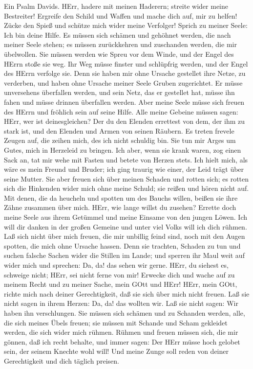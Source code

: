  Ein Psalm Davids. HErr, hadere mit meinen Haderern; streite
wider meine Bestreiter!  Ergreife den Schild und Waffen und
mache dich auf, mir zu helfen!  Zücke den Spieß und schütze
mich wider meine Verfolger! Sprich zu meiner Seele: Ich bin deine Hilfe.
 Es müssen sich schämen und gehöhnet werden, die nach meiner
Seele stehen; es müssen zurückkehren und zuschanden werden, die mir
übelwollen.  Sie müssen werden wie Spreu vor dem Winde, und
der Engel des HErrn stoße sie weg.  Ihr Weg müsse finster
und schlüpfrig werden, und der Engel des HErrn verfolge sie.
 Denn sie haben mir ohne Ursache gestellet ihre Netze, zu
verderben, und haben ohne Ursache meiner Seele Gruben zugerichtet.
 Er müsse unversehens überfallen werden, und sein Netz, das
er gestellet hat, müsse ihn fahen und müsse drinnen überfallen werden.
 Aber meine Seele müsse sich freuen des HErrn und fröhlich
sein auf seine Hilfe.  Alle meine Gebeine müssen sagen:
HErr, wer ist deinesgleichen? Der du den Elenden errettest von dem, der
ihm zu stark ist, und den Elenden und Armen von seinen Räubern.
 Es treten frevele Zeugen auf, die zeihen mich, des ich
nicht schuldig bin.  Sie tun mir Arges um Gutes, mich in
Herzeleid zu bringen.  Ich aber, wenn sie krank waren, zog
einen Sack an, tat mir wehe mit Fasten und betete von Herzen stets.
 Ich hielt mich, als wäre es mein Freund und Bruder; ich
ging traurig wie einer, der Leid trägt über seine Mutter. 
Sie aber freuen sich über meinen Schaden und rotten sich; es rotten sich
die Hinkenden wider mich ohne meine Schuld; sie reißen und hören nicht
auf.  Mit denen, die da heucheln und spotten um des Bauchs
willen, beißen sie ihre Zähne zusammen über mich.  HErr,
wie lange willst du zusehen? Errette doch meine Seele aus ihrem Getümmel
und meine Einsame von den jungen Löwen.  Ich will dir
danken in der großen Gemeine und unter viel Volks will ich dich rühmen.
 Laß sich nicht über mich freuen, die mir unbillig feind
sind, noch mit den Augen spotten, die mich ohne Ursache hassen.
 Denn sie trachten, Schaden zu tun und suchen falsche
Sachen wider die Stillen im Lande;  und sperren ihr Maul
weit auf wider mich und sprechen: Da, da! das sehen wir gerne.
 HErr, du siehest es, schweige nicht; HErr, sei nicht ferne
von mir!  Erwecke dich und wache auf zu meinem Recht und zu
meiner Sache, mein GOtt und HErr!  HErr, mein GOtt, richte
mich nach deiner Gerechtigkeit, daß sie sich über mich nicht freuen.
 Laß sie nicht sagen in ihrem Herzen: Da, da! das wollten
wir. Laß sie nicht sagen: Wir haben ihn verschlungen.  Sie
müssen sich schämen und zu Schanden werden, alle, die sich meines Übels
freuen; sie müssen mit Schande und Scham gekleidet werden, die sich
wider mich rühmen.  Rühmen und freuen müssen sich, die mir
gönnen, daß ich recht behalte, und immer sagen: Der HErr müsse hoch
gelobet sein, der seinem Knechte wohl will!  Und meine
Zunge soll reden von deiner Gerechtigkeit und dich täglich preisen.

